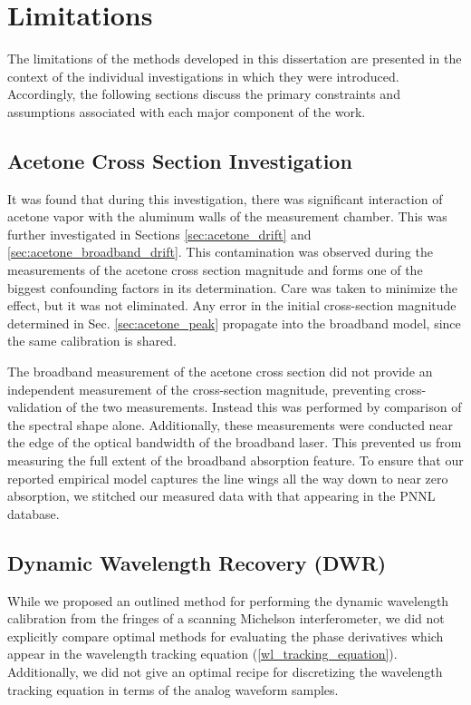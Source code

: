 \documentclass[12pt]{report}
\begin{document}
	\section{Limitations}
	The limitations of the methods developed in this dissertation are presented in the context of the individual investigations in which they were introduced. Accordingly, the following sections discuss the primary constraints and assumptions associated with each major component of the work.
	
	\subsection{Acetone Cross Section Investigation}
	It was found that during this investigation, there was significant interaction of acetone vapor with the aluminum walls of the measurement chamber. This was further investigated in Sections \ref{sec:acetone_drift} and \ref{sec:acetone_broadband_drift}. This contamination was observed during the measurements of the acetone cross section magnitude and forms one of the biggest confounding factors in its determination. Care was taken to minimize the effect, but it was not eliminated. Any error in the initial cross-section magnitude determined in Sec. \ref{sec:acetone_peak} propagate into the broadband model, since the same calibration is shared.
	
	The broadband measurement of the acetone cross section did not provide an independent measurement of the cross-section magnitude, preventing cross-validation of the two measurements. Instead this was performed by comparison of the spectral shape alone. Additionally, these measurements were conducted near the edge of the optical bandwidth of the broadband laser. This prevented us from measuring the full extent of the broadband absorption feature. To ensure that our reported empirical model captures the line wings all the way down to near zero absorption, we stitched our measured data with that appearing in the PNNL database.
	
	\subsection{Dynamic Wavelength Recovery (DWR)}
	While we proposed an outlined method for performing the dynamic wavelength calibration from the fringes of a scanning Michelson interferometer, we did not explicitly compare optimal methods for evaluating the phase derivatives which appear in the wavelength tracking equation (\ref{wl_tracking_equation}). Additionally, we did not give an optimal recipe for discretizing the wavelength tracking equation in terms of the analog waveform samples.
	
\end{document}
